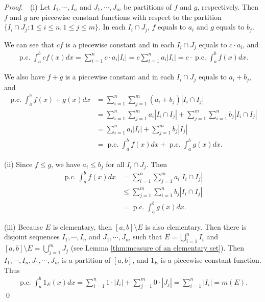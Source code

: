 \documentclass{book}
\theoremstyle{defstyle}
\theoremstyle{thmstyle}
\DeclareMathOperator{\PiecewiseConstant}{p.c.}
\newcommand{\pcint}{\PiecewiseConstant\int}
\newcommand{\pff}{\noindent\emph{Proof.}~~}
\begin{document}
\pff (i) Let $I_1, \cdots, I_n$ and $J_1, \cdots, J_m$ be partitions of $f$ and $g$, respectively. Then $f$ and $g$ are piecewise constant functions with respect to the partition $\{I_i \cap J_j : 1 \leq i \leq n, 1 \leq j \leq m\}$. In each $I_i \cap J_j$, $f$ equals to $a_i$ and $g$ equals to $b_j$.

We can see that $cf$ is a piecewise constant and in each $I_i \cap J_j$ equals to $c \cdot a_i$, and
    \begin{align*}
        \pcint_{a}^{b} cf(x)dx = \sum_{i = 1}^{n}c \cdot a_i|I_i| = c\sum_{i = 1}^{n}a_i|I_i| = c \cdot \pcint_{a}^{b} f(x)dx.
    \end{align*}

We also have $f + g$ is a piecewise constant and in each $I_i \cap J_j$ equals to $a_i + b_j$, and
    \begin{align*}
        \pcint_{a}^{b}f(x) + g(x)dx
        &= \sum_{i = 1}^{n}\sum_{j = 1}^{m}(a_i + b_j)|I_i \cap I_j|\\
        &= \sum_{i = 1}^{n}\sum_{j = 1}^{m}a_i|I_i \cap I_j| + \sum_{j = 1}^{m}\sum_{i = 1}^{n}b_j|I_i \cap I_j|\\
        &= \sum_{i = 1}^{n}a_i|I_i| + \sum_{j = 1}^{m}b_j|I_j|\\
        &= \pcint_{a}^{b}f(x)dx + \pcint_{a}^{b}g(x)dx.
    \end{align*}

(ii) Since $f \leq g$, we have $a_i \leq b_j$ for all $I_i \cap J_j$. Then
    \begin{align*}
        \pcint_{a}^{b}f(x)dx
        &= \sum_{i = 1}^{n}\sum_{j = 1}^{m}a_i|I_i \cap I_j|\\
        &\leq \sum_{j = 1}^{m}\sum_{i = 1}^{n}b_j|I_i \cap I_j|\\
        &= \pcint_{a}^{b}g(x)dx.
    \end{align*}

(iii) Because $E$ is elementary, then $[a, b] \setminus E$ is also elementary. Then there is disjoint sequences $I_1, \cdots, I_n$ and $J_1, \cdots, J_m$ such that $E = \bigcup_{i = 1}^{n}I_i$ and $[a, b] \setminus E = \bigcup_{j = 1}^{m}J_j$ (see Lemma \ref{thm:measure of an elementary set}). Then $I_1, \cdots, I_n, J_1, \cdots, J_m$ is a partition of $[a, b]$, and $1_E$ is a piecewise constant function. Thus
    \begin{align*}
        \pcint_{a}^{b}1_E(x)dx
        = \sum_{i = 1}^{n} 1 \cdot |I_i|
            + \sum_{j = 1}^{m} 0 \cdot |J_j|
        = \sum_{i = 1}^{n} |I_i|
        = m(E).
    \end{align*}\qed
\end{document}
